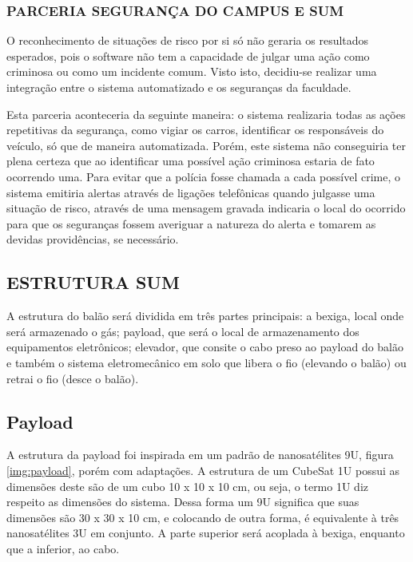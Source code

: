   \subsubsection{PARCERIA SEGURANÇA DO CAMPUS E SUM}
    O reconhecimento de situações de risco por si só não geraria os resultados esperados, pois o software não tem a capacidade de julgar uma ação como criminosa ou como um incidente comum. Visto isto, decidiu-se realizar uma integração entre o sistema automatizado e os seguranças da faculdade.
    
    Esta parceria aconteceria da seguinte maneira: o sistema realizaria todas as ações repetitivas da segurança, como vigiar os carros, identificar os responsáveis do veículo, só que de maneira automatizada. Porém, este sistema não conseguiria ter plena certeza que ao identificar uma possível ação criminosa estaria de fato ocorrendo uma. Para evitar que a polícia fosse chamada a cada possível crime, o sistema emitiria alertas através de ligações telefônicas quando julgasse uma situação de risco, através de uma mensagem gravada indicaria o local do ocorrido para que os seguranças fossem averiguar a natureza do alerta e tomarem as devidas providências, se necessário.
  
\subsection{ESTRUTURA SUM}

   A estrutura do balão será dividida em três partes principais: a bexiga, local onde será armazenado o gás; payload, que será o local de armazenamento dos equipamentos eletrônicos; elevador, que consite o cabo preso ao payload do balão e também o sistema eletromecânico em solo que libera o fio (elevando o balão) ou retrai o fio (desce o balão).

\subsection{Payload}
  
    A estrutura da payload foi inspirada em um padrão de nanosatélites 9U, figura \ref{img:payload}, porém com adaptações. A estrutura de um CubeSat 1U possui as dimensões deste são de um cubo 10 x 10 x 10 cm, ou seja, o termo 1U diz respeito as dimensões do sistema. Dessa forma um 9U significa que suas dimensões são 30 x 30 x 10 cm, e colocando de outra forma, é equivalente à três nanosatélites 3U em conjunto. A parte superior será acoplada à bexiga, enquanto que a inferior, ao cabo.

